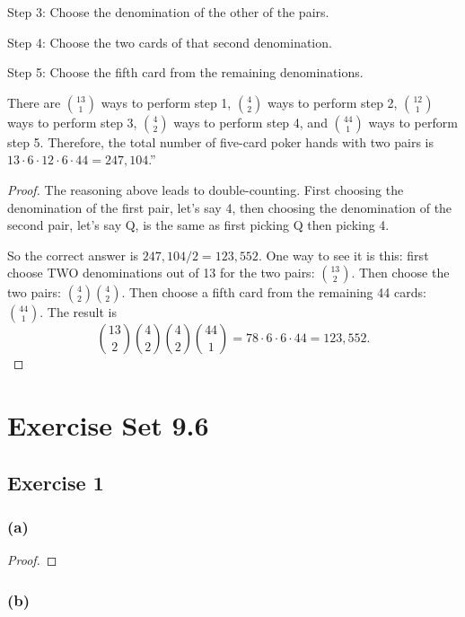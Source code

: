 \documentclass[14pt]{extarticle}
\newcommand{\cy}{\color{cyan}}
\begin{document}
{\cy Step 3:} Choose the denomination of the other of the pairs.

{\cy Step 4:} Choose the two cards of that second denomination.

{\cy Step 5:} Choose the fifth card from the remaining denominations.

There are \(\binom{13}{1}\) ways to perform step 1, \(\binom{4}{2}\) ways to perform step 2, \(\binom{12}{1}\) ways 
to perform step 3, \(\binom{4}{2}\) ways to perform step 4, and \(\binom{44}{1}\) ways to perform step 5. Therefore, the 
total number of five-card poker hands with two pairs is \(13 \cdot 6 \cdot 12 \cdot 6 \cdot 44 = 247,104\).”

\begin{proof}
The reasoning above leads to double-counting. First choosing the denomination of the first pair, let's say 4, then choosing
the denomination of the second pair, let's say Q, is the same as first picking Q then picking 4.

So the correct answer is \(247,104 / 2 = 123,552\). One way to see it is this: first choose TWO denominations out of 13 for
the two pairs: \(\binom{13}{2}\). Then choose the two pairs: \(\binom{4}{2}\binom{4}{2}\). Then choose a fifth card from the
remaining 44 cards: \(\binom{44}{1}\). The result is
\[
\binom{13}{2}\binom{4}{2}\binom{4}{2}\binom{44}{1} = 78 \cdot 6 \cdot 6 \cdot 44 = 123,552.
\]
\end{proof}

\section{Exercise Set 9.6}

\subsection{Exercise 1}

\subsubsection{(a)}

\begin{proof}

\end{proof}

\subsubsection{(b)}
\end{document}
